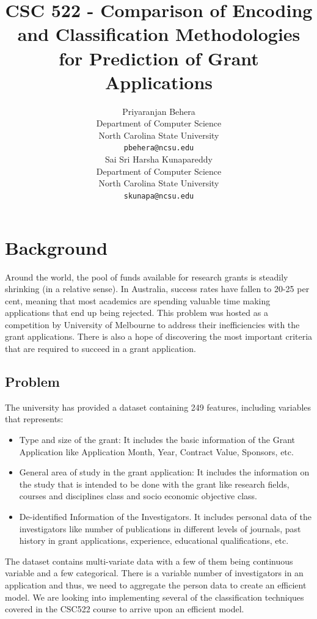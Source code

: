 \documentclass{article} %
\title{CSC 522 - Comparison of Encoding and Classification Methodologies for Prediction of Grant Applications}
\author{
Priyaranjan Behera\\
Department of Computer Science\\
North Carolina State University\\
\texttt{pbehera@ncsu.edu} \\
\And
Sai Sri Harsha Kunapareddy\\
Department of Computer Science\\
North Carolina State University\\
\texttt{skunapa@ncsu.edu} \\
}
\begin{document}
\maketitle

\section{Background}

Around the world, the pool of funds available for research grants is steadily shrinking (in a relative sense). In Australia, success rates have fallen to 20-25 per cent, meaning that most academics are spending valuable time making applications that end up being rejected. This problem was hosted as a competition by University of Melbourne to address their inefficiencies with the grant applications. There is also a hope of discovering the most important criteria that are required to succeed in a grant application. 

\subsection{Problem}

The university has provided a dataset containing 249 features, including variables that represents:

\begin{itemize}
	\item Type and size of the grant:
		It includes the basic information of the Grant Application like Application Month, Year, Contract Value, Sponsors, etc.
	\item General area of study in the grant application: It includes the information on the study that is intended to be done with the grant like  research fields, courses and disciplines class and socio economic objective class.
	\item De-identified Information of the Investigators. It includes personal data of the investigators like number of publications in different levels of journals, past history in grant applications, experience, educational qualifications, etc.  
\end{itemize}

The dataset contains multi-variate data with a few of them being continuous variable and a few categorical. There is a variable number of investigators in an application and thus, we need to aggregate the person data to create an efficient model. We are looking into implementing several of the classification techniques covered in the CSC522 course to arrive upon an efficient model.
\end{document}
